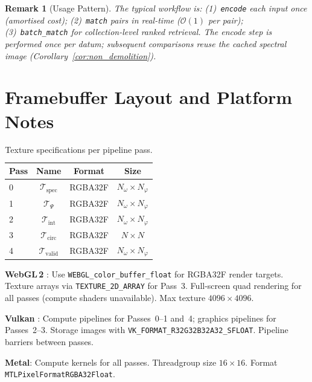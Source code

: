 \documentclass[11pt,twocolumn,a4paper]{article}
\newtheorem{remark}[theorem]{Remark}
\newcommand{\BigO}{\mathcal{O}}
\begin{document}
\begin{remark}[Usage Pattern]
The typical workflow is:
(1)~\texttt{encode} each input once (amortised cost);
(2)~\texttt{match} pairs in real-time ($\BigO(1)$ per pair);
(3)~\texttt{batch\_match} for collection-level ranked retrieval.
The encode step is performed once per datum; subsequent comparisons
reuse the cached spectral image (Corollary~\ref{cor:non_demolition}).
\end{remark}


\section{Framebuffer Layout and Platform Notes}
\label{sec:framebuffer}

\begin{table}[t]
\centering
\caption{Texture specifications per pipeline pass.}
\label{tab:textures}
\begin{tabular}{lccc}
\toprule
\textbf{Pass} & \textbf{Name} & \textbf{Format} & \textbf{Size} \\
\midrule
0 & $\mathcal{T}_{\text{spec}}$ & RGBA32F & $N_\omega \!\times\! N_\varphi$ \\
1 & $\mathcal{T}_{\Psi}$ & RGBA32F & $N_\omega \!\times\! N_\varphi$ \\
2 & $\mathcal{T}_{\text{int}}$ & RGBA32F & $N_\omega \!\times\! N_\varphi$ \\
3 & $\mathcal{T}_{\text{circ}}$ & RGBA32F & $N \times N$ \\
4 & $\mathcal{T}_{\text{valid}}$ & RGBA32F & $N_\omega \!\times\! N_\varphi$ \\
\bottomrule
\end{tabular}
\end{table}

\textbf{WebGL\,2} \citep{webgl2spec}: Use
\texttt{WEBGL\_color\_buffer\_float} for RGBA32F render targets. Texture
arrays via \texttt{TEXTURE\_2D\_ARRAY} for Pass~3. Full-screen quad
rendering for all passes (compute shaders unavailable). Max texture
$4096 \times 4096$.

\textbf{Vulkan} \citep{vulkanspec}: Compute pipelines for Passes~0--1
and~4; graphics pipelines for Passes~2--3. Storage images with
\texttt{VK\_FORMAT\_R32G32B32A32\_SFLOAT}. Pipeline barriers between
passes.

\textbf{Metal}: Compute kernels for all passes. Threadgroup size
$16 \times 16$. Format \texttt{MTLPixelFormatRGBA32Float}.
\end{document}
